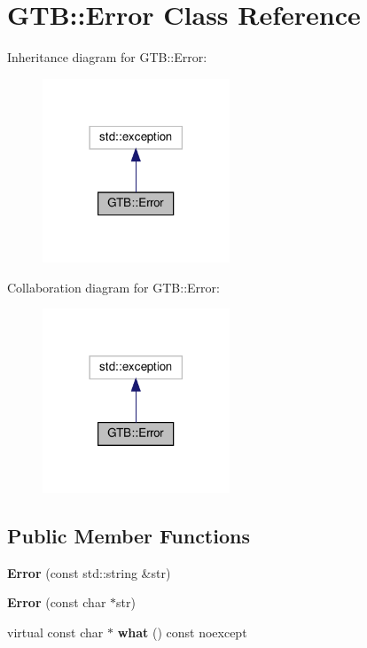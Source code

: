\hypertarget{a00012}{}\section{G\+TB\+:\+:Error Class Reference}
\label{a00012}


Inheritance diagram for G\+TB\+:\+:Error\+:\nopagebreak
\begin{figure}[H]
\begin{center}
\leavevmode
\includegraphics[width=158pt]{a00011}
\end{center}
\end{figure}


Collaboration diagram for G\+TB\+:\+:Error\+:\nopagebreak
\begin{figure}[H]
\begin{center}
\leavevmode
\includegraphics[width=158pt]{a00010}
\end{center}
\end{figure}
\subsection*{Public Member Functions}
\begin{DoxyCompactItemize}
\item 
\mbox{\label{a00012_a031a14b03c0216488ba8bcca38a3ac8d}} 
{\bfseries Error} (const std\+::string \&str)
\item 
\mbox{\label{a00012_a2a8e6b4c9abf65b57741cb14b0eb2c39}} 
{\bfseries Error} (const char $\ast$str)
\item 
\mbox{\label{a00012_ab9fee344d3f1be089c12e50e8f49297d}} 
virtual const char $\ast$ {\bfseries what} () const noexcept
\end{DoxyCompactItemize}
